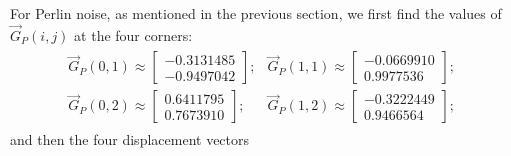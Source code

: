 For Perlin noise, as mentioned in the previous section, we first find the values of $\vec{G}_P(i,j)$ at the four corners:
\begin{align*}
    \begin{matrix}
        \vec{G}_P(0,1)\approx
        \begin{bmatrix}
            -0.3131485\\
            -0.9497042    
        \end{bmatrix}; &
        \vec{G}_P(1,1)\approx
        \begin{bmatrix}
            -0.0669910\\
            0.9977536    
        \end{bmatrix}; \\
        \vec{G}_P(0,2)\approx
        \begin{bmatrix}
            0.6411795\\
            0.7673910   
        \end{bmatrix}; & 
        \vec{G}_P(1,2)\approx
        \begin{bmatrix}
            -0.3222449\\
            0.9466564
        \end{bmatrix};
    \end{matrix}
\end{align*}
and then the four displacement vectors
